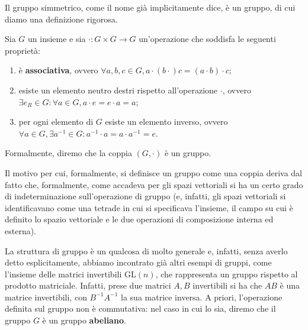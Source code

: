 Il gruppo simmetrico, come il nome già implicitamente dice, è un gruppo, di cui diamo una definizione rigorosa.
\begin{definition}[gruppo]
    Sia $G$ un insieme e sia $\cdot: G \times G \to G$ un'operazione che soddisfa le seguenti proprietà:
    \begin{enumerate}[label=\protect\circled{\arabic*}]
        \item è \textbf{associativa}, ovvero $\forall a, b, c \in G, a\cdot(b \cdot) c = (a \cdot b) \cdot c;$
        \item esiste un elemento neutro destri rispetto all'operazione $\cdot$, ovvero $\exists e_R \in G : \forall a \in G, a \cdot e = e \cdot a = a;$
        \item per ogni elemento di $G$ esiste un elemento inverso, ovvero $\forall a \in G, \exists a^{-1} \in G : a^{-1} \cdot a = a \cdot a^{-1} = e$.
    \end{enumerate}
    Formalmente, diremo che la coppia $(G, \cdot)$ è un gruppo.
\end{definition}
\begin{remark}
    Il motivo per cui, formalmente, si definisce un gruppo come una coppia deriva dal fatto che, formalmente, come accadeva per gli spazi vettoriali si ha un certo grado di indeterminazione sull'operazione di gruppo (e, infatti, gli spazi vettoriali si identificavano come una tetrade in cui si specificava l'insieme, il campo su cui è definito lo spazio vettoriale e le due operazioni di composizione interna ed esterna).
\end{remark}
La struttura di gruppo è un qualcosa di molto generale e, infatti, senza averlo detto esplicitamente, abbiamo incontrato già altri esempi di gruppi, come l'insieme delle matrici invertibili $\text{GL}(n)$, che rappresenta un gruppo rispetto al prodotto matriciale. Infatti, prese due matrici $A, B$ invertibili si ha che $AB$ è una matrice invertibili, con $B^{-1} A^{-1}$ la sua matrice inversa. A priori, l'operazione definita sul gruppo non è commutativa: nel caso in cui lo sia, diremo che il gruppo $G$ è un gruppo \textbf{abeliano}. 

